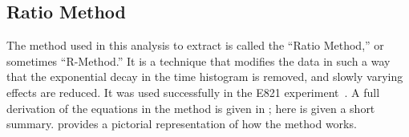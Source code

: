

\subsection{Ratio Method}
\label{sub:ratio_method}


The method used in this analysis to extract \wa is called the ``Ratio Method,'' or sometimes ``R-Method.'' It is a technique that modifies the data in such a way that the exponential decay in the time histogram is removed, and slowly varying effects are reduced. It was used successfully in the E821 experiment~\cite{JKThesis,LDThesis,JPThesis}. A full derivation of the equations in the method is given in ; here is given a short summary.  provides a pictorial representation of how the method works.

